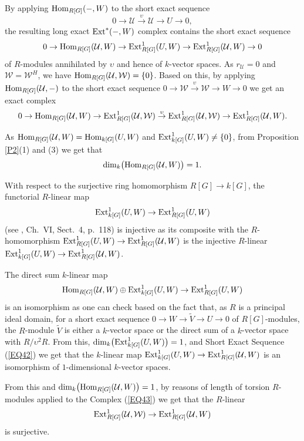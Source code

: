 \documentclass[11pt]{amsart}
\def\Ext{\textup{Ext}}
\def\Hom{\textup{Hom}}
\begin{document}
By applying $\Hom_{R[G]}(-,W)$ to the short exact sequence 
$$0\rightarrow\mathcal U\overset{\upsilon}\rightarrow\mathcal U\rightarrow U\rightarrow 0,$$ the resulting long exact $\Ext^{*}(-,W)$ complex contains the short exact sequence
\begin{equation}\label{EQ42}
0\rightarrow\Hom_{R[G]}(\mathcal U,W)\rightarrow\Ext_{R[G]}^1(U,W)\rightarrow\Ext_{R[G]}^1(\mathcal U,W)\rightarrow 0
\end{equation}
of $R$-modules annihilated by $\upsilon$ and hence of $k$-vector spaces. As $r_{\mathcal U}=0$ and $\mathcal W=\mathcal W^H$, we have $\Hom_{R[G]}(\mathcal U,\mathcal W)=\{0\}$. Based on this, by applying $\Hom_{R[G]}(\mathcal U,-)$ to the short exact sequence $0\rightarrow\mathcal W\overset{\upsilon}\rightarrow\mathcal W\rightarrow W\rightarrow 0$ we get an exact complex
\begin{equation}\label{EQ43}
0\rightarrow\Hom_{R[G]}(\mathcal U,W)\rightarrow\Ext_{R[G]}^1(\mathcal U,\mathcal W)\overset{\upsilon}\rightarrow\Ext_{R[G]}^1(\mathcal U,\mathcal W)\rightarrow\Ext_{R[G]}^1(\mathcal U,W).
\end{equation}

As $\Hom_{R[G]}(\mathcal U,W)=\Hom_{k[G]}(U,W)$ and $\Ext^1_{k[G]}(U,W)\neq \{0\}$, from Proposition \ref{P2}(1) and (3) we get that
$$\dim_k\bigl(\Hom_{R[G]}(\mathcal U,W)\bigr)=1.$$

With respect to the surjective ring homomorphism $R[G]\rightarrow k[G]$, the functorial $R$-linear map 
$$\Ext^1_{k[G]}(U,W)\rightarrow \Ext^1_{R[G]}(U,W)$$ 
(see \cite{CE}, Ch.\ VI, Sect.\ 4, p.\ 118) is injective as its composite with the $R$-homomorphism $\Ext_{R[G]}^1(U,W)\rightarrow\Ext_{R[G]}^1(\mathcal U,W)$ is the injective $R$-linear $\Ext^1_{k[G]}(U,W)\rightarrow \Ext^1_{R[G]}(\mathcal U,W)$. 

The direct sum $k$-linear map 
$$\Hom_{R[G]}(\mathcal U,W)\oplus\Ext^1_{k[G]}(U,W)\rightarrow \Ext_{R[G]}^1(U,W)$$ 
is an isomorphism as one can check based on the fact that, as $R$ is a principal ideal domain, for a short exact sequence $0\rightarrow W\rightarrow \tilde V\rightarrow U\rightarrow 0$ of $R[G]$-modules, the $R$-module $\tilde V$ is either a $k$-vector space or the direct sum of a $k$-vector space with $R/\upsilon^2R$. From this, $\dim_k\bigl(\Ext^1_{k[G]}(U,W)\bigr)=1$, and Short Exact Sequence (\ref{EQ42}) we get that the $k$-linear map $\Ext^1_{k[G]}(U,W)\rightarrow\Ext^1_{R[G]}(\mathcal U,W)$ is an isomorphism of $1$-dimensional $k$-vector spaces. 

From this and $\dim_k\bigl(\Hom_{R[G]}(\mathcal U,W)\bigr)=1$, by reasons of length of torsion $R$-modules applied to the Complex (\ref{EQ43}) we get that the $R$-linear 
$$\Ext_{R[G]}^1(\mathcal U,\mathcal W)\rightarrow\Ext_{R[G]}^1(\mathcal U,W)$$ 
is surjective. 
\end{document}
